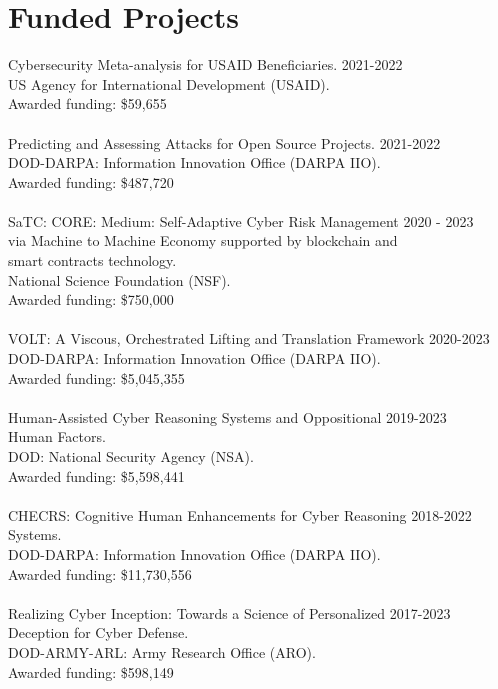 \section{Funded Projects}
Cybersecurity Meta-analysis for USAID Beneficiaries. \hfill{2021-2022} \\
US Agency for International Development (USAID). \\
Awarded funding: \$59,655
\\\\

Predicting and Assessing Attacks for Open Source Projects. \hfill{2021-2022} \\
DOD-DARPA: Information Innovation Office (DARPA IIO). \\
Awarded funding: \$487,720
\\\\

SaTC: CORE: Medium: Self-Adaptive Cyber Risk Management  \hfill{2020 - 2023} \\ 
via Machine to Machine Economy supported by blockchain and \\
smart contracts technology.\\
National Science Foundation (NSF). \\
Awarded funding: \$750,000 
\\\\


VOLT: A Viscous, Orchestrated Lifting and Translation Framework	\hfill{2020-2023} \\
DOD-DARPA: Information Innovation Office (DARPA IIO). \\
Awarded funding: \$5,045,355
\\\\


Human-Assisted Cyber Reasoning Systems and Oppositional \hfill{2019-2023} \\
Human Factors. \\
DOD: National Security Agency (NSA). \\
Awarded funding: \$5,598,441
\\\\

CHECRS: Cognitive Human Enhancements for Cyber Reasoning \hfill{2018-2022} \\
Systems.  \\
DOD-DARPA: Information Innovation Office (DARPA IIO). \\
Awarded funding: \$11,730,556
\\\\

Realizing Cyber Inception: Towards a Science of Personalized \hfill{2017-2023} \\
Deception for Cyber Defense. \\
DOD-ARMY-ARL: Army Research Office (ARO). \\
Awarded funding: \$598,149
